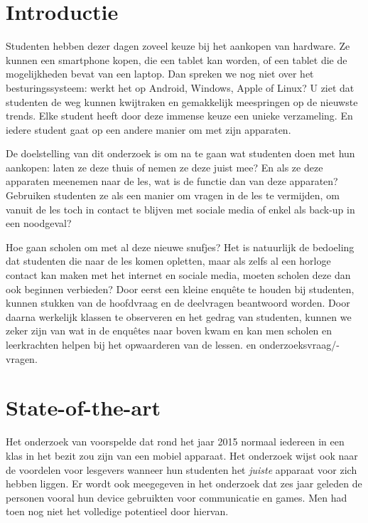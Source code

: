 
\section{Introductie} %
\label{sec:introductie}

Studenten hebben dezer dagen zoveel keuze bij het aankopen van hardware. Ze kunnen een smartphone kopen, die een tablet kan worden, of een tablet die de mogelijkheden bevat van een laptop. Dan spreken we nog niet over het besturingssysteem: werkt het op Android, Windows, Apple of Linux? U ziet dat studenten de weg kunnen kwijtraken en gemakkelijk meespringen op de nieuwste trends. Elke student heeft door deze immense keuze een unieke verzameling. En iedere student gaat op een andere manier om met zijn apparaten.

De doelstelling van dit onderzoek is om na te gaan wat studenten doen met hun aankopen: laten ze deze thuis of nemen ze deze juist mee? En als ze deze apparaten meenemen naar de les, wat is de functie dan van deze apparaten? Gebruiken studenten ze als een manier om vragen in de les te vermijden, om vanuit de les toch in contact te blijven met sociale media of enkel als back-up in een noodgeval?

Hoe gaan scholen om met al deze nieuwe snufjes? Het is natuurlijk de bedoeling dat studenten die naar de les komen opletten, maar als zelfs al een horloge contact kan maken met het internet en sociale media, moeten scholen deze dan ook beginnen verbieden? Door eerst een kleine enquête te houden bij studenten, kunnen stukken van de hoofdvraag en de deelvragen beantwoord worden. Door daarna werkelijk klassen te observeren en het gedrag van studenten, kunnen we zeker zijn van wat in de enquêtes naar boven kwam en kan men scholen en leerkrachten helpen bij het opwaarderen van de lessen. en onderzoeksvraag/-vragen.

\section{State-of-the-art}
\label{sec:state-of-the-art}

Het onderzoek van \textcite{3} voorspelde dat rond het jaar 2015 normaal iedereen in een klas in het bezit zou zijn van een mobiel apparaat. Het onderzoek wijst ook naar de voordelen voor lesgevers wanneer hun studenten het \emph{juiste} apparaat voor zich hebben liggen. Er wordt ook meegegeven in het onderzoek dat zes jaar geleden de personen vooral hun device gebruikten voor communicatie en games. Men had toen nog niet het volledige potentieel door hiervan. 

